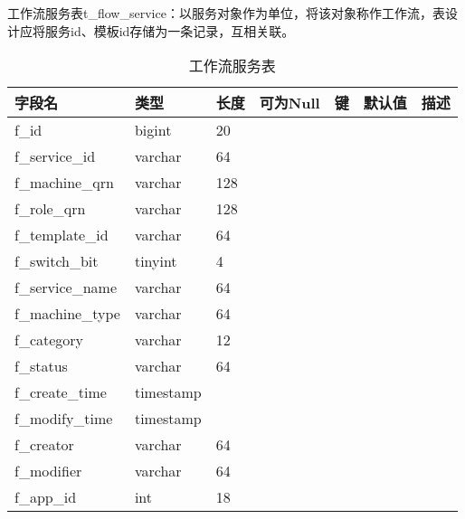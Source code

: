 工作流服务表t\_flow\_service：以服务对象作为单位，将该对象称作工作流，表设计应将服务id、模板id存储为一条记录，互相关联。
\begin{table}[H]
    \centering
    \caption{工作流服务表}
    \label{tab:t_flow_service}
    \begin{tabular}{lllllll}
        \toprule
        字段名	&类型	&长度	&可为Null	&键	&默认值	&描述 \\
        \midrule
        f\_id	&bigint	&20 &&&& \\
        f\_service\_id	&varchar	&64 &&&& \\
        f\_machine\_qrn	&varchar	&128 &&&& \\
        f\_role\_qrn	&varchar	&128 &&&& \\
        f\_template\_id	&varchar	&64 &&&& \\
        f\_switch\_bit	&tinyint	&4 &&&& \\
        f\_service\_name	&varchar	&64 &&&& \\
        f\_machine\_type	&varchar	&64 &&&& \\
        f\_category	&varchar	&12 &&&& \\
        f\_status	&varchar	&64 &&&& \\
        f\_create\_time	&timestamp & &&&& \\
        f\_modify\_time   &timestamp & &&&& \\
        f\_creator	&varchar	&64 &&&& \\
        f\_modifier	&varchar	&64 &&&& \\
        f\_app\_id	&int	&18 &&&& \\
        \bottomrule
    \end{tabular}
\end{table}

